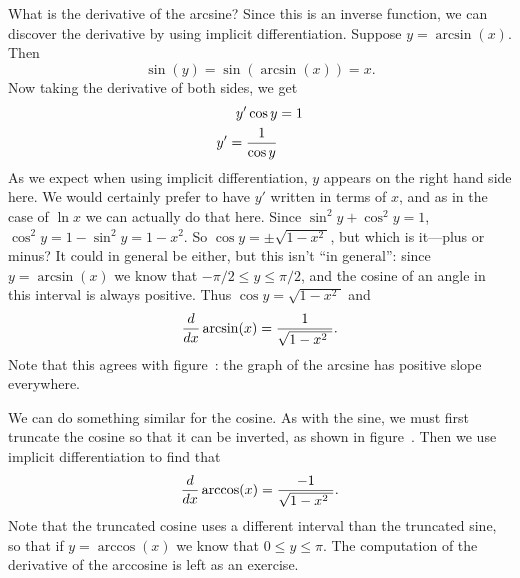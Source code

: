 What is the derivative of the arcsine? Since this is an inverse
function, we can discover the derivative by using implicit
differentiation. Suppose $y=\arcsin(x)$. Then 
$$\sin(y)=\sin(\arcsin(x))=x.$$
Now taking the derivative of both sides, we get
\begin{align*}
y'\cos y &= 1 \\
y'={1\over \cos y} \\
\end{align*}
As we expect when using implicit differentiation, $y$ appears on the
right hand side here. We would certainly prefer to have $y'$ written
in terms of $x$, and as in the case of $\ln x$ we can actually do that
here. Since $\sin^2y+\cos^2 y=1$, $\cos^2y=1-\sin^2y=1-x^2$. So 
$\cos y=\pm\sqrt{1-x^2\ }$, but which is it---plus or minus? It could
in general be either, but this isn't ``in general'': since
$y=\arcsin(x)$ we know that $-\pi/2\le y\le \pi/2$, and the cosine of
an angle in this interval is always positive. Thus
$\cos y=\sqrt{1-x^2\ }$ and
$${d\over dx}\arcsin(x)={1\over \sqrt{1-x^2\ }}.$$
Note that this agrees with figure~: the
graph of the arcsine has positive slope everywhere.

We can do something similar for the cosine. As with the sine, we must
first truncate the cosine so that it can be inverted, as shown in
figure~. Then we use
implicit differentiation to find that
$${d\over dx}\arccos(x)={-1\over \sqrt{1-x^2\ }}.$$ Note that the
truncated cosine uses a different interval than the truncated sine, so
that if $y=\arccos(x)$ we know that $0\le y\le \pi$. The computation
of the derivative of the arccosine is left as an exercise.

